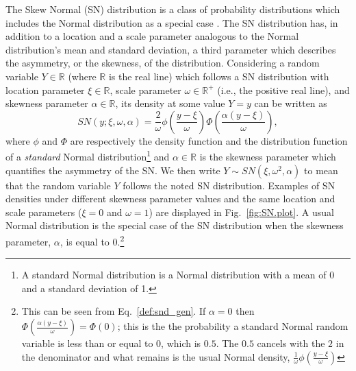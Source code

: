 \documentclass[11pt, oneside]{article}
\begin{document}
The Skew Normal (SN) distribution is a class of probability distributions which includes the Normal distribution as a special case \citep{Azzalini1985}. The SN distribution has, in addition to a location and a scale parameter analogous to the Normal distribution's mean and standard deviation, a third parameter which describes the asymmetry, or the skewness, of the distribution. Considering a random variable $Y\in \mathbb R$ (where $\mathbb R$ is the real line) which follows a SN distribution with location parameter $\xi \in \mathbb R$, scale parameter $\omega \in \mathbb R^{+}$ (i.e., the positive real line), and skewness parameter $\alpha \in \mathbb R$, its density at some value $Y = y$ can be written as 
\begin{equation} \label{def:snd_gen}
SN(y;\xi, \omega, \alpha) = \frac{2}{\omega} \phi\left(\frac{y-\xi}{\omega}\right) \Phi\left(\frac{\alpha(y-\xi)}{\omega}\right),
\end{equation}
where $\phi$ and $\Phi$ are respectively the density function and the distribution function of a \emph{standard} Normal distribution\footnote{A standard Normal distribution is a Normal distribution with a mean of 0 and a standard deviation of 1.}
 and $\alpha \in \mathbb R$ is the skewness parameter which quantifies the asymmetry of the SN.  We then write $Y \sim SN(\xi, \omega^{2}, \alpha)$ to mean that the random variable $Y$ follows the noted SN distribution.
Examples of SN densities under different skewness parameter values and the same location and scale parameters ($\xi = 0$ and $\omega = 1$) are displayed in Fig.~\ref{fig:SN.plot}.  A usual Normal distribution is the special case of the SN distribution when the skewness parameter, $\alpha$, is equal to 0.\footnote{This can be seen from Eq.~\eqref{def:snd_gen}.  If $\alpha = 0$ then $\Phi\left(\frac{\alpha(y-\xi)}{\omega}\right) = \Phi(0)$; this is the the probability a standard Normal random variable is less than or equal to 0, which is $0.5$.  The $0.5$ cancels with the $2$ in the denominator and what remains is the usual Normal density, $\frac{1}{\omega} \phi\left(\frac{y-\xi}{\omega}\right)$}
%
\end{document}
